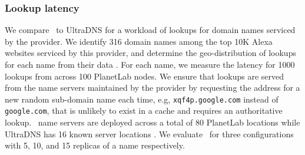 





\subsubsection{Lookup latency}  


We compare \auspice\ to UltraDNS for a workload of lookups for  domain names serviced by the provider. We identify 316 domain names among the top 10K Alexa websites serviced by this provider, and determine
the geo-distribution of lookups for each name from their data \cite{alexa}.
For each name, we measure the latency for 1000 lookups from across 100 PlanetLab nodes. 
We ensure that lookups are served from the name servers maintained by the provider by requesting the address for a new random sub-domain name each time, e.g, \verb+xqf4p.google.com+ instead of \verb+google.com+, that is unlikely to exist in a cache and requires an authoritative lookup.
\auspice\ name servers are deployed across a total of 80 PlanetLab locations while UltraDNS has 16 known server locations \cite{dnscompare}.  
We evaluate \auspice\ for three configurations  with 5, 10, and 15 replicas of a name respectively. 





